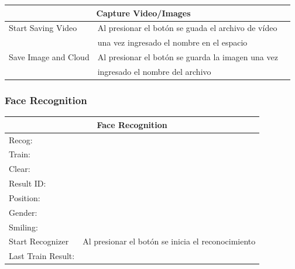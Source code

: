 \documentclass[user_manual.tex]{subfiles}
\begin{document}
\begin{table}[H]
\begin{center}
\begin{tabular}{|l|l|l|}%

\hline
\multicolumn{2}{|c|}{Capture Video/Images}\\ \hline
Start Saving Video    & Al presionar el botón se guada el archivo de vídeo  \\
                      &una vez ingresado el nombre en el espacio  \\ \hline
Save Image and Cloud  & Al presionar el botón se guarda la imagen una vez\\
					   & ingresado el nombre del archivo  \\ \hline


\end{tabular}
\end{center}
\end{table}




\subsubsection{Face Recognition}

\begin{table}[H]
\begin{center}
\begin{tabular}{|l|l|}%

\hline
\multicolumn{2}{|c|}{Face Recognition}\\ \hline
Recog:                  &\\ \hline
Train:                  &\\ \hline
Clear:                  &\\ \hline
Result ID:              &\\ \hline
Position:               &\\ \hline
Gender:                 &\\ \hline 
Smiling:                &\\ \hline
Start Recognizer        & Al presionar el botón se inicia el reconocimiento\\ \hline
Last Train Result:      &\\ \hline
\end{tabular}
\end{center}
\end{table}
\end{document}
